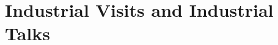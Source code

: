 \hypertarget{sec:4.6industrialvisits}{%
\section{Industrial Visits and Industrial Talks}\label{sec:4.6industrialvisits}}

